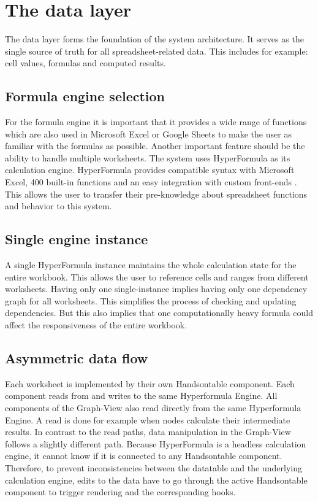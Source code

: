 \section{The data layer}
The data layer forms the foundation of the system architecture. It serves as the single source of truth for all spreadsheet-related data. This includes for example: cell values, formulas and computed results.
\subsection{Formula engine selection}
For the formula engine it is important that it provides a wide range of functions which are also used in Microsoft Excel or Google Sheets to make the user as familiar with the formulas as possible. Another important feature should be the ability to handle multiple worksheets. The system uses HyperFormula as its calculation engine. HyperFormula provides compatible syntax with Microsoft Excel, 400 built-in functions and an easy integration with custom front-ends \cite{hyperformula}. This allows the user to transfer their pre-knowledge about spreadsheet functions and behavior to this system.
\subsection{Single engine instance}
A single HyperFormula instance maintains the whole calculation state for the entire workbook. This allows the user to reference cells and ranges from different worksheets. Having only one single-instance implies having only one dependency graph for all worksheets. This simplifies the process of checking and updating dependencies. But this also implies that one computationally heavy formula could affect the responsiveness of the entire workbook.
\subsection{Asymmetric data flow}
Each worksheet is implemented by their own Handsontable\cite{handsontable} component. Each component reads from and writes to the same Hyperformula Engine. All components of the Graph-View also read directly from the same Hyperformula Engine. A read is done for example when nodes calculate their intermediate results.
In contrast to the read paths, data manipulation in the Graph-View follows a slightly different path. Because HyperFormula is a headless calculation engine, it cannot know if it is connected to any Handsontable component. Therefore, to prevent inconsistencies between the datatable and the underlying calculation engine, edits to the data have to go through the active Handsontable component to trigger rendering and the corresponding hooks. 






